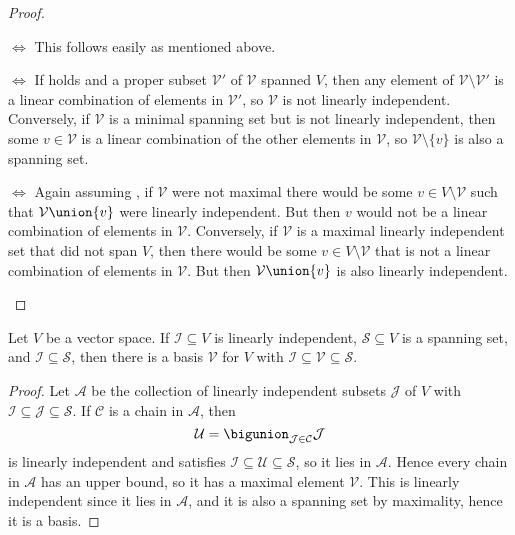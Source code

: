 \documentclass[a4paper, 11pt]{memoir}
\theoremstyle{plaincustomnumber}
\theoremstyle{changedotbreakcustomnumber}
\newcommand{\calV}{\mathcal{V}}
\newcommand{\calU}{\mathcal{U}}
\newcommand{\calI}{\mathcal{I}}
\newcommand{\calJ}{\mathcal{J}}
\newcommand{\calS}{\mathcal{S}}
\newcommand{\calA}{\mathcal{A}}
\newcommand{\calC}{\mathcal{C}}
\begin{document}
\begin{proof}
\begin{proofsec*}
    \item[\subcref{enum:linearly-independent-and-span} $\iff$ \subcref{enum:essentially-unique-linear-combination}]
    This follows easily as mentioned above.

    \item[\subcref{enum:linearly-independent-and-span} $\iff$ \subcref{enum:minimal-spanning-set}]
    If  holds and a proper subset $\calV'$ of $\calV$ spanned $V$, then any element of $\calV \setminus \calV'$ is a linear combination of elements in $\calV'$, so $\calV$ is not linearly independent. Conversely, if $\calV$ is a minimal spanning set but is not linearly independent, then some $v \in \calV$ is a linear combination of the other elements in $\calV$, so $\calV \setminus \{v\}$ is also a spanning set.

    \item[\subcref{enum:linearly-independent-and-span} $\iff$ \subcref{enum:maximal-linearly-independent-set}]
    Again assuming , if $\calV$ were not maximal there would be some $v \in V \setminus \calV$ such that $\calV \union \{v\}$ were linearly independent. But then $v$ would not be a linear combination of elements in $\calV$. Conversely, if $\calV$ is a maximal linearly independent set that did not span $V$, then there would be some $v \in V \setminus \calV$ that is not a linear combination of elements in $\calV$. But then $\calV \union \{v\}$ is also linearly independent.
\end{proofsec*}
\end{proof}


\begin{theorem}
    \label{prop:basis-existence}
    Let $V$ be a vector space. If $\calI \subseteq V$ is linearly independent, $\calS \subseteq V$ is a spanning set, and $\calI \subseteq \calS$, then there is a basis $\calV$ for $V$ with $\calI \subseteq \calV \subseteq \calS$.
\end{theorem}

\begin{proof}
    Let $\calA$ be the collection of linearly independent subsets $\calJ$ of $V$ with $\calI \subseteq \calJ \subseteq \calS$. If $\calC$ is a chain in $\calA$, then
    \begin{equation*}
        \calU
            = \bigunion_{\calJ \in \calC} \calJ
    \end{equation*}
    is linearly independent and satisfies $\calI \subseteq \calU \subseteq \calS$, so it lies in $\calA$. Hence every chain in $\calA$ has an upper bound, so it has a maximal element $\calV$. This is linearly independent since it lies in $\calA$, and it is also a spanning set by maximality, hence it is a basis.
\end{proof}
\end{document}
